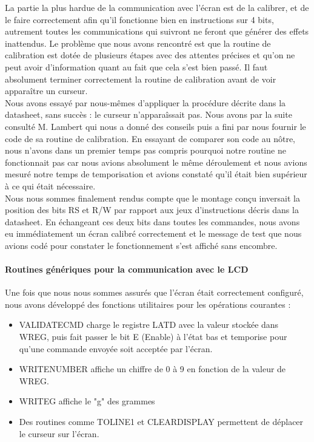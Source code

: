 \documentclass[a4paper,11pt,titlepage]{article}
\begin{document}
La partie la plus hardue de la communication avec l'écran est de la calibrer, et de le faire correctement afin qu'il fonctionne bien en instructions sur 4 bits, autrement toutes les communications qui suivront ne feront que générer des effets inattendus. Le problème que nous avons rencontré est que la routine de calibration est dotée de plusieurs étapes avec des attentes précises et qu'on ne peut avoir d'information quant au fait que cela s'est bien passé. Il faut absolument terminer correctement la routine de calibration avant de voir apparaître un curseur.\\

Nous avons essayé par nous-mêmes d'appliquer la procédure décrite dans la datasheet, sans succès : le curseur n'apparaîssait pas.
Nous avons par la suite consulté M. Lambert qui nous a donné des conseils puis a fini par nous fournir le code de sa routine de calibration. En essayant de comparer son code au nôtre, nous n'avons dans un premier temps pas compris pourquoi notre routine ne fonctionnait pas car nous avions absolument le même déroulement et nous avions mesuré notre temps de temporisation et avions constaté qu'il était bien supérieur à ce qui était nécessaire.\\

Nous nous sommes finalement rendus compte que le montage conçu inversait la position des bits RS et R/W par rapport aux jeux d'instructions décris dans la datasheet. En échangeant ces deux bits dans toutes les commandes, nous avons eu immédiatement un écran calibré correctement et le message de test que nous avions codé pour constater le fonctionnement s'est affiché sans encombre.\\

\paragraph{Routines génériques pour la communication avec le LCD}

Une fois que nous nous sommes assurés que l'écran était correctement configuré, nous avons développé des fonctions utilitaires pour les opérations courantes :

\begin{itemize}
  \item VALIDATECMD charge le registre LATD avec la valeur stockée dans WREG, puis fait passer le bit E (Enable) à l'état bas et temporise pour qu'une commande envoyée soit acceptée par l'écran.
  \item WRITENUMBER affiche un chiffre de 0 à 9 en fonction de la valeur de WREG.
  \item WRITEG affiche le "g" des grammes
  \item Des routines comme TOLINE1 et CLEARDISPLAY permettent de déplacer le curseur sur l'écran.
\end{itemize}
\end{document}
